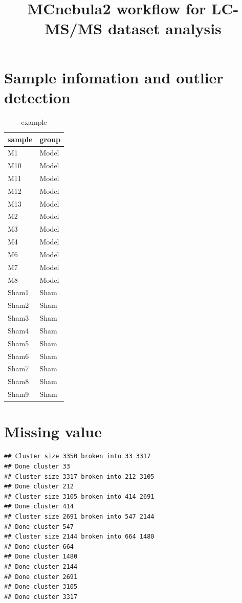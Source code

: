 \documentclass[
]{article}
\title{MCnebula2 workflow for LC-MS/MS dataset analysis}
\author{}
\date{\vspace{-2.5em}}
\begin{document}
\maketitle

{
\setcounter{tocdepth}{3}
\tableofcontents
}
\section{Sample infomation and outlier detection}\label{sample-infomation-and-outlier-detection}

\begin{table}[!h]
\centering
\caption{\label{tab:unnamed-chunk-2}example}
\centering
\begin{tabular}[t]{ll}
\toprule
sample & group\\
\midrule
M1 & Model\\
M10 & Model\\
M11 & Model\\
M12 & Model\\
M13 & Model\\
\addlinespace
M2 & Model\\
M3 & Model\\
M4 & Model\\
M6 & Model\\
M7 & Model\\
\addlinespace
M8 & Model\\
Sham1 & Sham\\
Sham2 & Sham\\
Sham3 & Sham\\
Sham4 & Sham\\
\addlinespace
Sham5 & Sham\\
Sham6 & Sham\\
Sham7 & Sham\\
Sham8 & Sham\\
Sham9 & Sham\\
\bottomrule
\end{tabular}
\end{table}

\section{Missing value}\label{missing-value}

\begin{verbatim}
## Cluster size 3350 broken into 33 3317 
## Done cluster 33 
## Cluster size 3317 broken into 212 3105 
## Done cluster 212 
## Cluster size 3105 broken into 414 2691 
## Done cluster 414 
## Cluster size 2691 broken into 547 2144 
## Done cluster 547 
## Cluster size 2144 broken into 664 1480 
## Done cluster 664 
## Done cluster 1480 
## Done cluster 2144 
## Done cluster 2691 
## Done cluster 3105 
## Done cluster 3317
\end{verbatim}
\end{document}
